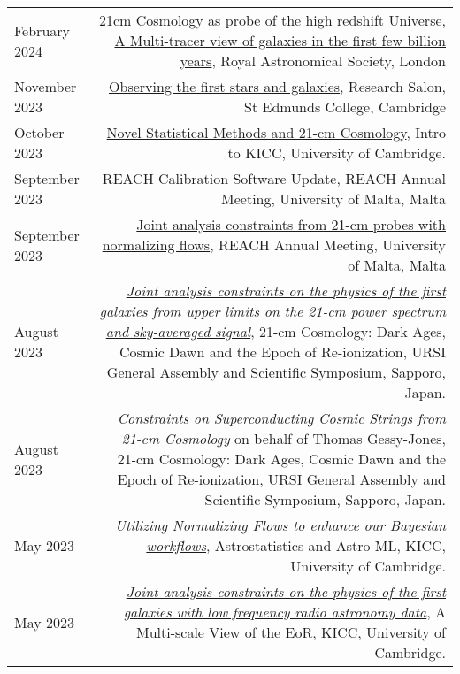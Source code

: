\documentclass{article}
\begin{document}
\begin{tabular}{L!{\vrule}R}
    February 2024 & \href{https://github.com/htjb/Talks/raw/master/Talks/RAS_Multi-tracer_View/21cmCosmo.pdf}{21cm Cosmology as probe of the high redshift Universe}, \href{https://ras.ac.uk/events-and-meetings/ras-meetings/multi-tracer-view-galaxies-first-few-billion-years}{A Multi-tracer view of galaxies in the first few billion years}, Royal Astronomical Society, London \\
    November 2023 & \href{https://github.com/htjb/Talks/raw/master/Talks/St_Edmunds_Research_Salon_Nov_2023/research_salon.pdf}{Observing the first stars and galaxies}, Research Salon, St Edmunds College, Cambridge \\
    October 2023 & \href{https://github.com/htjb/Talks/raw/master/Talks/KICC_Intro_23/kicc_intro_23.pdf}{Novel Statistical Methods and 21-cm Cosmology}, Intro to KICC, University of Cambridge. \\
    September 2023 & REACH Calibration Software Update, REACH Annual Meeting, University of Malta, Malta \\
    September 2023 & \href{https://github.com/htjb/Talks/tree/master/Talks/REACH_Malta/joint_analysis_margarine.pdf}{Joint analysis constraints from 21-cm probes with normalizing flows}, REACH Annual Meeting, University of Malta, Malta \\
    August 2023 & \href{https://github.com/htjb/Talks/raw/master/Talks/URSI_2023/joint_analysis_margarine.pdf}{\textit{Joint analysis constraints on the physics of the first galaxies from upper limits on the 21-cm power spectrum and sky-averaged signal}}, 21-cm Cosmology: Dark Ages, Cosmic Dawn and the Epoch of Re-ionization, URSI General Assembly and Scientific Symposium, Sapporo, Japan. \\
    August 2023 & \textit{Constraints on Superconducting Cosmic Strings from 21-cm Cosmology} on behalf of Thomas Gessy-Jones, 21-cm Cosmology: Dark Ages, Cosmic Dawn and the Epoch of Re-ionization, URSI General Assembly and Scientific Symposium, Sapporo, Japan. \\
    May 2023 & \href{https://github.com/htjb/Talks/blob/master/Talks/KICC_EoR/Bevins_KICC_EoR.pdf}{\textit{Utilizing Normalizing Flows to enhance our Bayesian workflows}}, Astrostatistics and Astro-ML, KICC, University of Cambridge. \\
    May 2023 & \href{https://github.com/htjb/Talks/blob/master/Talks/KICC_EoR/Bevins_KICC_EoR.pdf}{\textit{Joint analysis constraints on the physics of the first galaxies with low frequency radio astronomy data}}, A Multi-scale View of the EoR, KICC, University of Cambridge. \\

\end{tabular}
\end{document}
